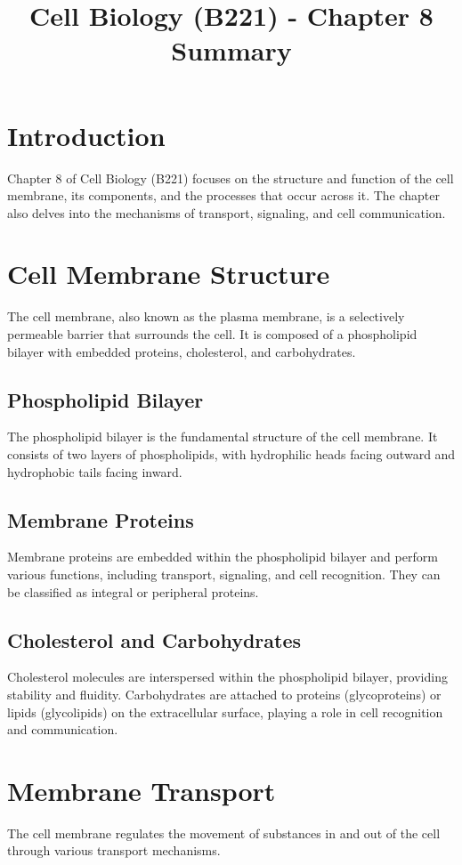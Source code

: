 \documentclass{article}
\title{Cell Biology (B221) - Chapter 8 Summary}
\author{}
\date{}
\begin{document}
\maketitle

\section{Introduction}
Chapter 8 of Cell Biology (B221) focuses on the structure and function of the cell membrane, its components, and the processes that occur across it. The chapter also delves into the mechanisms of transport, signaling, and cell communication.

\section{Cell Membrane Structure}
The cell membrane, also known as the plasma membrane, is a selectively permeable barrier that surrounds the cell. It is composed of a phospholipid bilayer with embedded proteins, cholesterol, and carbohydrates.

\subsection{Phospholipid Bilayer}
The phospholipid bilayer is the fundamental structure of the cell membrane. It consists of two layers of phospholipids, with hydrophilic heads facing outward and hydrophobic tails facing inward.

\subsection{Membrane Proteins}
Membrane proteins are embedded within the phospholipid bilayer and perform various functions, including transport, signaling, and cell recognition. They can be classified as integral or peripheral proteins.

\subsection{Cholesterol and Carbohydrates}
Cholesterol molecules are interspersed within the phospholipid bilayer, providing stability and fluidity. Carbohydrates are attached to proteins (glycoproteins) or lipids (glycolipids) on the extracellular surface, playing a role in cell recognition and communication.

\section{Membrane Transport}
The cell membrane regulates the movement of substances in and out of the cell through various transport mechanisms.
\end{document}

